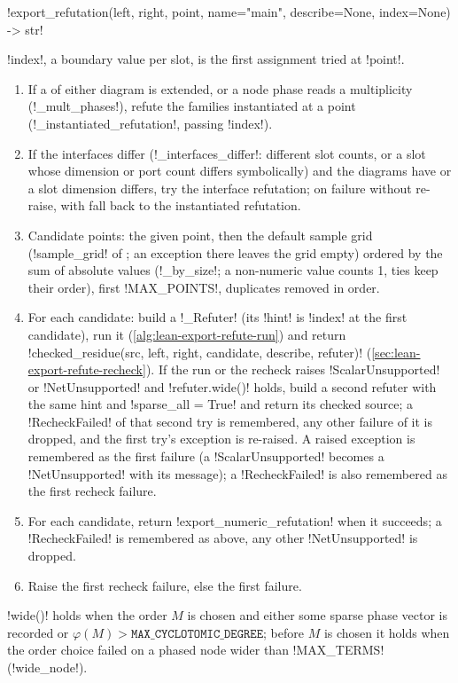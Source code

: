 {{{\begin{signature}
\lexpy!export_refutation(left, right, point, name="main", describe=None, index=None) -> str!
\end{signature}
\lexcode!index!, a boundary value per slot, is the first assignment tried at \lexcode!point!.
\begin{algorithm}\label{alg:lean-export-refute-dispatch}
\begin{enumerate}
\item If a \bbox of either diagram is extended, or a node phase reads a \bbox multiplicity
(\lexpy!_mult_phases!), refute the families instantiated at a point
(\lexpy!_instantiated_refutation!, passing \lexcode!index!).
\item If the interfaces differ (\lexpy!_interfaces_differ!: different slot counts, or a slot whose
dimension or port count differs symbolically) and the diagrams have \bboxes or a slot dimension
differs, try the interface refutation; on failure without \bboxes re-raise, with \bboxes fall
back to the instantiated refutation.
\item Candidate points: the given point, then the default sample grid
(\lexpy!sample_grid! of ; an exception there leaves the grid
empty) ordered by the sum of absolute values (\lexpy!_by_size!; a non-numeric value counts 1,
ties keep their order), first \lexpy!MAX_POINTS!, duplicates removed in order.
\item For each candidate: build a \lexpy!_Refuter! (its \lexpy!hint! is \lexcode!index! at the first
candidate), run it (\cref{alg:lean-export-refute-run}) and return
\lexpy!checked_residue(src, left, right, candidate, describe, refuter)!
(\cref{sec:lean-export-refute-recheck}). If the run or the recheck raises
\lexpy!ScalarUnsupported! or \lexpy!NetUnsupported! and \lexpy!refuter.wide()! holds, build a second
refuter with the same hint and \lexpy!sparse_all = True! and return its checked source; a
\lexpy!RecheckFailed! of that second try is remembered, any other failure of it is dropped, and the
first try's exception is re-raised. A raised exception is remembered as the first failure (a
\lexpy!ScalarUnsupported! becomes a \lexpy!NetUnsupported! with its message); a \lexpy!RecheckFailed! is
also remembered as the first recheck failure.
\item For each candidate, return \lexpy!export_numeric_refutation! when it succeeds; a
\lexpy!RecheckFailed! is remembered as above, any other \lexpy!NetUnsupported! is dropped.
\item Raise the first recheck failure, else the first failure.
\end{enumerate}
\end{algorithm}
\lexpy!wide()! holds when the order $M$ is chosen and either some sparse phase vector is recorded
or $\varphi(M) > \mathtt{MAX\_CYCLOTOMIC\_DEGREE}$; before $M$ is chosen it holds when the order
choice failed on a phased node wider than \lexpy!MAX_TERMS! (\lexpy!wide_node!).

}}}
